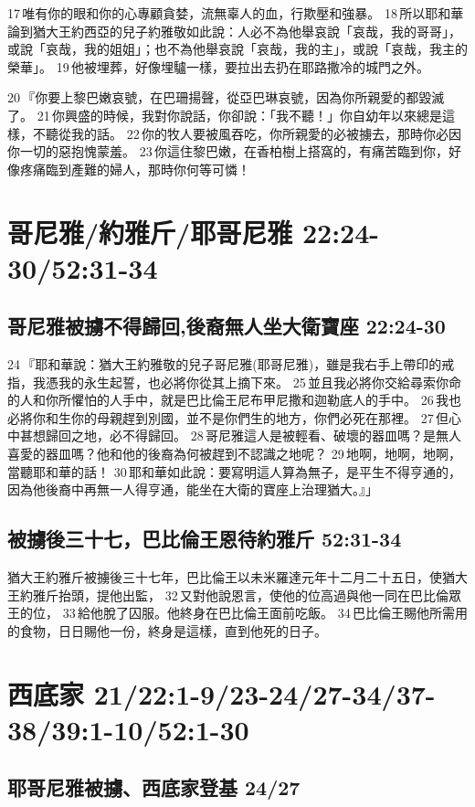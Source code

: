 17 唯有你的眼和你的心專顧貪婪，流無辜人的血，行欺壓和強暴。 18 所以耶和華論到猶大王約西亞的兒子約雅敬如此說：人必不為他舉哀說「哀哉，我的哥哥」，或說「哀哉，我的姐姐」；也不為他舉哀說「哀哉，我的主」，或說「哀哉，我主的榮華」。 19 他被埋葬，好像埋驢一樣，要拉出去扔在耶路撒冷的城門之外。

20 『你要上黎巴嫩哀號，在巴珊揚聲，從亞巴琳哀號，因為你所親愛的都毀滅了。 21 你興盛的時候，我對你說話，你卻說：「我不聽！」你自幼年以來總是這樣，不聽從我的話。 22 你的牧人要被風吞吃，你所親愛的必被擄去，那時你必因你一切的惡抱愧蒙羞。 23 你這住黎巴嫩，在香柏樹上搭窩的，有痛苦臨到你，好像疼痛臨到產難的婦人，那時你何等可憐！



\section{哥尼雅/約雅斤/耶哥尼雅 22:24-30/52:31-34}
\subsection{哥尼雅被擄不得歸回,後裔無人坐大衛寶座 22:24-30}

24 『耶和華說：猶大王約雅敬的兒子哥尼雅(耶哥尼雅)，雖是我右手上帶印的戒指，我憑我的永生起誓，也必將你從其上摘下來。 25 並且我必將你交給尋索你命的人和你所懼怕的人手中，就是巴比倫王尼布甲尼撒和迦勒底人的手中。 26 我也必將你和生你的母親趕到別國，並不是你們生的地方，你們必死在那裡。 27 但心中甚想歸回之地，必不得歸回。 28 哥尼雅這人是被輕看、破壞的器皿嗎？是無人喜愛的器皿嗎？他和他的後裔為何被趕到不認識之地呢？ 29 地啊，地啊，地啊，當聽耶和華的話！ 30 耶和華如此說：要寫明這人算為無子，是平生不得亨通的，因為他後裔中再無一人得亨通，能坐在大衛的寶座上治理猶大。』」

\subsection{被擄後三十七，巴比倫王恩待約雅斤 52:31-34}
猶大王約雅斤被擄後三十七年，巴比倫王以未米羅達元年十二月二十五日，使猶大王約雅斤抬頭，提他出監， 32 又對他說恩言，使他的位高過與他一同在巴比倫眾王的位， 33 給他脫了囚服。他終身在巴比倫王面前吃飯。 34 巴比倫王賜他所需用的食物，日日賜他一份，終身是這樣，直到他死的日子。


\section{西底家 21/22:1-9/23-24/27-34/37-38/39:1-10/52:1-30}
\subsection{耶哥尼雅被擄、西底家登基 24/27}

